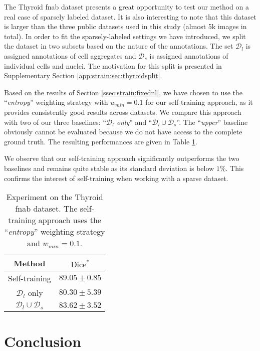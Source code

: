 The Thyroid \acrshort{fnab} dataset presents a great opportunity to test our method on a real case of sparsely labeled dataset. It is also interesting to note that this dataset is larger than the three public datasets used in this study (almost 5k images in total). In order to fit the sparsely-labeled settings we have introduced, we split the dataset in two subsets based on the nature of the annotations. The set $\mathcal{D}_l$ is assigned annotations of cell aggregates and $\mathcal{D}_s$ is assigned annotations of individual cells and nuclei. The motivation for this split is presented in Supplementary Section \ref{app:strain:sec:thyroidsplit}.

Based on the results of Section \ref{ssec:strain:fixednl}, we have chosen to use the ``\textit{entropy}'' weighting strategy with $w_{min} = 0.1$ for our self-training approach, as it provides consistently good results across datasets. We compare this approach with two of our three baselines: ``\textit{$\mathcal{D}_l$ only}'' and ``$\mathcal{D}_l \cup \mathcal{D}_s$''. The ``\textit{upper}'' baseline obviously cannot be evaluated because we do not have access to the complete ground truth. The resulting performances are given in Table \ref{tab:strain:thyroidresults}.

We observe that our self-training approach significantly outperforms the two baselines and remains quite stable as its standard deviation is below $1\%$. This confirms the interest of self-training when working with a sparse dataset. 

\begin{table}[t]
\caption{Experiment on the Thyroid \acrshort{fnab} dataset. The self-training approach uses the ``\textit{entropy}'' weighting strategy and $w_{min} = 0.1$.}
  \label{tab:strain:thyroidresults}
  \centering 
  \begin{tabular}{|c|c|}
    \hline
    Method & $\text{Dice}^*$ \\
    \hline
    Self-training & $89.05 \pm 0.85$ \\
    $\mathcal{D}_l$ only & $80.30 \pm 5.39$\\  
    $\mathcal{D}_l \cup \mathcal{D}_s$ & $83.62 \pm 3.52$\\
    \hline
  \end{tabular}
  
\end{table}

\section{Conclusion}
\label{sec:strain:conclusion}

